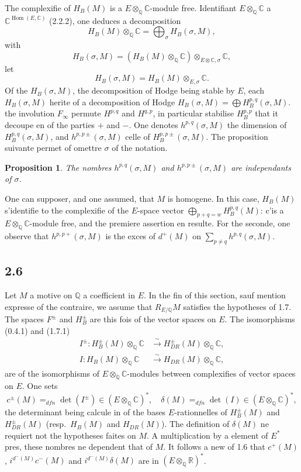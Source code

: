 \documentclass[12pt,a4paper]{article}
\theoremstyle{plain}
\newtheorem{proposition}[theorem]{Proposition}
\theoremstyle{definition}
\theoremstyle{remark}
\DeclareMathOperator{\Hom}{Hom}
\newcommand{\Q}{\mathbb{Q}}
\newcommand{\R}{\mathbb{R}}
\newcommand{\C}{\mathbb{C}}
\begin{document}
The complexifie of $H_B(M)$ is a $E \otimes_\Q \C$-module free. Identifiant
$E \otimes_\Q \C$ a $\C^{\Hom(E,\C)}$ (2.2.2), one deduces a decomposition
\[
H_B(M) \otimes_\Q \C = \bigoplus_\sigma H_B(\sigma, M),
\]
with
\[
H_B(\sigma, M) = (H_B(M) \otimes_\Q \C) \otimes_{E \otimes \C, \sigma} \C,
\]
let
\[
H_B(\sigma, M) = H_B(M) \otimes_{E, \sigma} \C.
\]
Of the $H_B(\sigma, M)$, the decomposition of Hodge being stable by $E$, each
$H_B(\sigma, M)$ herite of a decomposition of Hodge
$H_B(\sigma, M) = \bigoplus H^{p,q}_B(\sigma, M)$. the involution $F_\infty$ permute $H^{p,q}$ and $H^{q,p}$,
in particular stabilise $H^{p,p}_B$ that it decoupe en of the parties $+$ and $-$. One denotes
$h^{p,q}(\sigma, M)$ the dimension of $H^{p,q}_B(\sigma, M)$, and $h^{p,p\pm}(\sigma, M)$ celle of
$H^{p,p\pm}_B(\sigma, M)$. The proposition suivante permet of omettre $\sigma$ of the notation.

\begin{proposition}\label{prop:2.5}
The nombres $h^{p,q}(\sigma, M)$ and $h^{p,p\pm}(\sigma, M)$ are independants of $\sigma$.
\end{proposition}

One can supposer, and one assumed, that $M$ is homogene. In this case, $H_B(M)$
s'identifie to the complexifie of the $E$-space vector $\bigoplus_{p+q=w} H^{p,q}_B(M)$: c'is a
$E \otimes_\Q \C$-module free, and the premiere assertion en resulte. For the seconde, one
observe that $h^{p,p+}(\sigma, M)$ is the exces of $d^+(M)$ on $\sum_{p \neq q} h^{p,q}(\sigma, M)$.

\subsection*{2.6}

Let $M$ a motive on $\Q$ a coefficient in $E$. In the fin of this section, sauf
mention expresse of the contraire, we assume that $R_{E/\Q} M$ satisfies the hypotheses
of 1.7. The spaces $F^\pm$ and $H^\pm_B$ are this fois of the vector spaces on $E$. The
isomorphisms (0.4.1) and (1.7.1)
\begin{align}
I^\pm: H^\pm_B(M) \otimes_\Q \C &\xrightarrow{\sim} H^\pm_{DR}(M) \otimes_\Q \C, \label{eq:2.6.1}\\
I: H_B(M) \otimes_\Q \C &\xrightarrow{\sim} H_{DR}(M) \otimes_\Q \C, \label{eq:2.6.2}
\end{align}
are of the isomorphisms of $E \otimes_\Q \C$-modules between complexifies of vector spaces
on $E$. One sets
\[
c^\pm(M) =_{dfn} \det(I^\pm) \in (E \otimes_\Q \C)^*, \quad \delta(M) =_{dfn} \det(I) \in (E \otimes_\Q \C)^*,
\]
the determinant being calcule in of the bases $E$-rationnelles of $H^\pm_B(M)$ and
$H^\pm_{DR}(M)$ (resp.~$H_B(M)$ and $H_{DR}(M)$). The definition of $\delta(M)$ ne requiert not the
hypotheses faites on $M$. A multiplication by a element of $E^*$ pres, these nombres ne
dependent that of $M$. It follows a new of 1.6 that $c^+(M)$, $i^{d^-(M)} c^-(M)$ and
$i^{d^-(M)} \delta(M)$ are in $(E \otimes_\Q \R)^*$.
\end{document}
